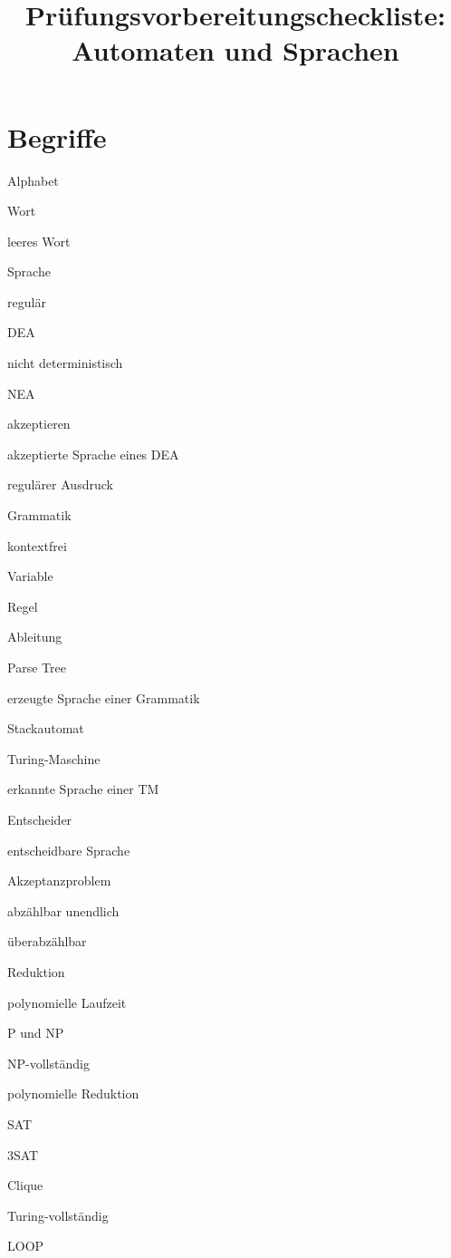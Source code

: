 \documentclass[a4paper,12pt,twocolumn]{article}
\begin{document}
\title{Prüfungsvorbereitungscheckliste:\\ Automaten und Sprachen}
\date{}
\maketitle
\section{Begriffe}
\begin{compactenum}
\item Alphabet
\item Wort
\item leeres Wort
\item Sprache
\item regulär
\item DEA
\item nicht deterministisch
\item NEA
\item akzeptieren
\item akzeptierte Sprache eines DEA
\item regulärer Ausdruck
\item Grammatik
\item kontextfrei
\item Variable
\item Regel
\item Ableitung
\item Parse Tree
\item erzeugte Sprache einer Grammatik
\item Stackautomat
\item Turing-Maschine
\item erkannte Sprache einer TM
\item Entscheider
\item entscheidbare Sprache
\item Akzeptanzproblem
\item abzählbar unendlich
\item überabzählbar
\item Reduktion
\item polynomielle Laufzeit
\item P und NP
\item NP-vollständig
\item polynomielle Reduktion
\item SAT
\item 3SAT
\item Clique
\item Turing-vollständig
\item LOOP
\end{compactenum}
\vfill
\end{document}
